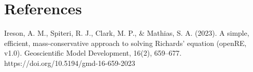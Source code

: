 \documentclass[10pt,a4paper]{article}
\begin{document}
%
%
%
%
%
%
%
%
%
%
%
%
%
%
%
%

%

\section{References}

Ireson, A. M., Spiteri, R. J., Clark, M. P., \& Mathias, S. A. (2023). A simple, efficient, mass-conservative approach to solving Richards’ equation (openRE, v1.0). Geoscientific Model Development, 16(2), 659–677. https://doi.org/10.5194/gmd-16-659-2023
\end{document}

